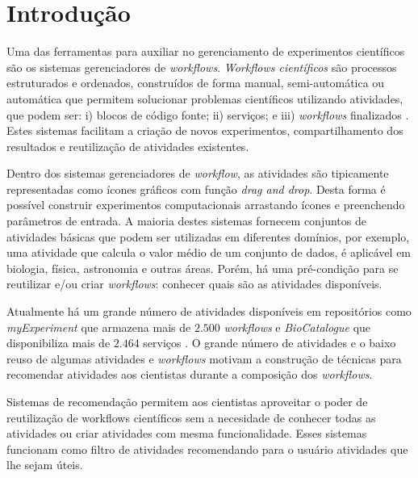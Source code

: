 \documentclass{acm_proc_article-sp}
\begin{document}


\section{Introdu\c{c}{\~a}o}\label{INTRODUCAO}
Uma das ferramentas para auxiliar no gerenciamento de experimentos cient{\'i}ficos s{\~a}o os sistemas gerenciadores de \emph{workflows}. \emph{Workflows cient{\'i}ficos} s{\~a}o processos estruturados e ordenados, constru{\'i}dos de forma manual, semi-autom{\'a}tica ou autom{\'a}tica que permitem solucionar problemas cient{\'i}ficos utilizando atividades, que podem ser: i) blocos de c{\'o}digo fonte; ii) servi\c{c}os; e iii) \emph{workflows} finalizados \cite{Wang2010}. Estes sistemas facilitam a cria\c{c}{\~a}o de novos experimentos, compartilhamento dos resultados e reutiliza\c{c}{\~a}o de atividades existentes.

Dentro dos sistemas gerenciadores de \textit{workflow}, as atividades s{\~a}o tipicamente representadas como {\'i}cones gr{\'a}ficos com fun\c{c}{\~a}o \textit{drag and drop}. Desta forma {\'e} poss{\'i}vel construir experimentos computacionais arrastando {\'i}cones e preenchendo par{\^a}metros de entrada. A maioria destes sistemas fornecem conjuntos de atividades b{\'a}sicas que podem ser utilizadas em diferentes dom{\'i}nios, por exemplo, uma atividade que calcula o valor m{\'e}dio de um conjunto de dados, {\'e} aplic{\'a}vel em biologia, f{\'i}sica, astronomia e outras {\'a}reas. Por{\'e}m, h{\'a} uma pr{\'e}-condi\c{c}{\~a}o para se reutilizar e/ou criar \textit{workflows}: conhecer quais s{\~a}o as atividades dispon{\'i}veis.

Atualmente h{\'a} um grande n{\'u}mero de atividades dispon{\'i}veis em reposit{\'o}rios como \emph{myExperiment} que armazena mais de \(2.500\) \emph{workflows} \cite{myExperiment} e \emph{BioCatalogue} que disponibiliza mais de \(2.464\) servi\c{c}os \cite{Biocatalogue}. O grande n{\'u}mero de atividades e o baixo reuso de algumas atividades e \emph{workflows} \cite{Wang2010} motivam a constru\c{c}{\~a}o de t{\'e}cnicas para recomendar atividades aos cientistas durante a composi\c{c}{\~a}o dos \emph{workflows}.

Sistemas de recomenda\c{c}{\~a}o permitem aos cientistas aproveitar o poder de reutiliza\c{c}{\~a}o de workflows cient{\'i}ficos sem a necesidade de conhecer todas as atividades ou criar atividades com mesma funcionalidade. Esses sistemas funcionam como filtro de atividades recomendando para o usu{\'a}rio atividades que lhe sejam {\'u}teis. 
\end{document}
